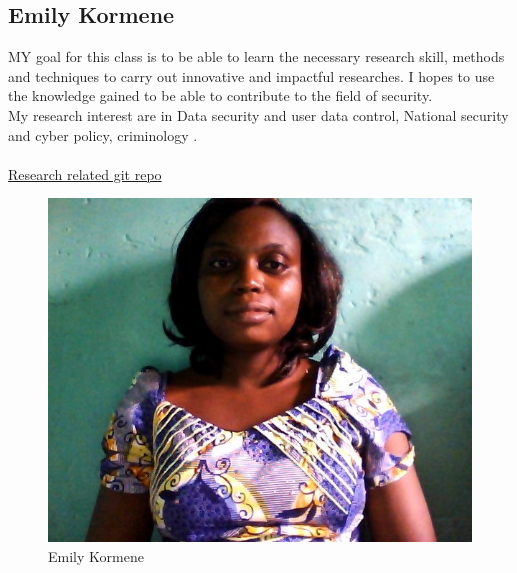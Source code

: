 \usepackage{hyperref}

\subsection{Emily Kormene}

MY goal for this class is to be able to learn the necessary research skill, methods and techniques to carry out innovative and impactful researches. I hopes to use the knowledge gained to be able to contribute to the field of security.\\

My research interest are in Data security and user data control, National security and cyber policy, criminology .\\\\

\href{https://github.com/brianlovin/security-checklist}{Research related git repo}

\begin{figure} [h]

\begin{center}

\includegraphics[scale=0.3]{Kormene.jpg}

\end{center}

\caption{Emily Kormene}

\end{figure}
